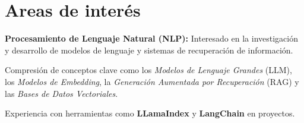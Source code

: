 \section{Areas de interés}

\begin{onecolentry}
    \textbf{Procesamiento de Lenguaje Natural (NLP):} Interesado en la investigación y desarrollo de modelos de lenguaje y sistemas de recuperación de información.
    \begin{highlights}
        \item Compresión de conceptos clave como los \textit{Modelos de Lenguaje Grandes} (LLM), los \textit{Modelos de Embedding}, la \textit{Generación Aumentada por Recuperación} (RAG) y las \textit{Bases de Datos Vectoriales}.
        \item Experiencia con herramientas como \textbf{LLamaIndex} y \textbf{LangChain} en proyectos.
    \end{highlights}
\end{onecolentry}